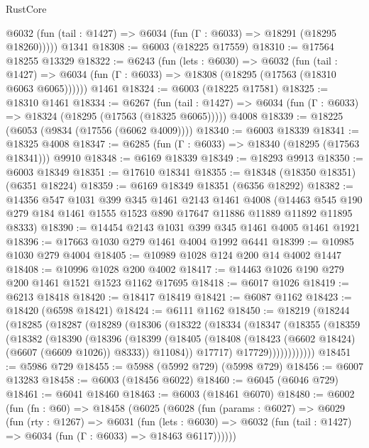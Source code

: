 \begin{lexlean}{RustCore}
\begin{coremodule}
      @6032 (fun (tail : @1427) => @6034 (fun (Γ : @6033) => @18291 (@18295 @18260)))))
    @1341
@18308 := @6003 (@18225 @17559)
@18310 := @17564 @18255 @13329
@18322 := @6243
    (fun (lets : @6030) =>
    @6032
      (fun (tail : @1427) =>
      @6034 (fun (Γ : @6033) => @18308 (@18295 (@17563 (@18310 @6063 @6065))))))
    @1461
@18324 := @6003 (@18225 @17581)
@18325 := @18310 @1461
@18334 := @6267
    (fun (tail : @1427) => @6034 (fun (Γ : @6033) => @18324 (@18295 (@17563 (@18325 @6065)))))
    @4008
@18339 := @18225 (@6053 (@9834 (@17556 (@6062 @4009))))
@18340 := @6003 @18339
@18341 := @18325 @4008
@18347 := @6285 (fun (Γ : @6033) => @18340 (@18295 (@17563 @18341))) @9910
@18348 := @6169 @18339
@18349 := @18293 @9913
@18350 := @6003 @18349
@18351 := @17610 @18341
@18355 := @18348 (@18350 @18351) (@6351 @18224)
@18359 := @6169 @18349 @18351 (@6356 @18292)
@18382 := @14356
    @547
    @1031
    @399
    @345
    @1461
    @2143
    @1461
    @4008
    (@14463 @545 @190 @279 @184 @1461 @1555 @1523 @890 @17647 @11886 @11889 @11892 @11895 @8333)
@18390 := @14454 @2143 @1031 @399 @345 @1461 @4005 @1461 @1921
@18396 := @17663 @1030 @279 @1461 @4004 @1992 @6441
@18399 := @10985 @1030 @279 @4004
@18405 := @10989 @1028 @124 @200 @14 @4002 @1447
@18408 := @10996 @1028 @200 @4002
@18417 := @14463 @1026 @190 @279 @200 @1461 @1521 @1523 @1162 @17695
@18418 := @6017 @1026
@18419 := @6213 @18418
@18420 := @18417 @18419
@18421 := @6087 @1162
@18423 := @18420 (@6598 @18421)
@18424 := @6111 @1162
@18450 := @18219
    (@18244
      (@18285
        (@18287
          (@18289
            (@18306
              (@18322
                (@18334
                  (@18347
                    (@18355
                      (@18359
                        (@18382
                          (@18390
                            (@18396
                              (@18399
                                (@18405
                                  (@18408 (@18423 (@6602 @18424) (@6607 (@6609 @1026)) @8333))
                                  @11084))
                              @17717)
                            @17729))))))))))))
@18451 := @5986 @729
@18455 := @5988 (@5992 @729) (@5998 @729)
@18456 := @6007 @13283
@18458 := @6003 (@18456 @6022)
@18460 := @6045 (@6046 @729)
@18461 := @6041 @18460
@18463 := @6003 (@18461 @6070)
@18480 := @6002
    (fun (fn : @60) =>
    @18458
      (@6025
        (@6028
          (fun (params : @6027) =>
          @6029
            (fun (rty : @1267) =>
            @6031
              (fun (lets : @6030) =>
              @6032 (fun (tail : @1427) => @6034 (fun (Γ : @6033) => @18463 @6117))))))

\end{coremodule}
\end{lexlean}

